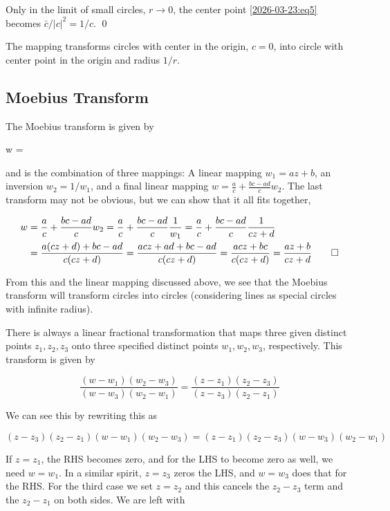 Only in the limit of small circles, $r \rightarrow 0$, the center point \eqref{2026-03-23:eq5} becomes $\bar{c} / |c|^2 = 1 / c$. \qed

The mapping transforms circles with center in the origin, $c = 0$, into circle with center point in the origin and radius $1/r$.



\subsection{Moebius Transform}

The Moebius transform is given by

\bee
w = 
\eee

and is the combination of three mappings: A linear mapping $w_1 = az+b$, an inversion $w_2 = 1/w_1$, and a final linear mapping $w = \frac{a}{c} + \frac{bc - ad}{c} w_2$. The last transform may not be obvious, but we can show that it all fits together,

\begin{align*}
    w &= \frac{a}{c} + \frac{bc - ad}{c} w_2 = \frac{a}{c} + \frac{bc - ad}{c} \frac{1}{w_1} = \frac{a}{c} + \frac{bc - ad}{c} \frac{1}{cz+d} \\
    &= \frac{a(cz+d) + bc - ad}{c(cz+d)} = \frac{acz+ad + bc - ad}{c(cz+d)} = \frac{acz+ bc}{c(cz+d)} = \frac{az + b}{cz + d} \qed
\end{align*}

From this and the linear mapping discussed above, we see that the Moebius transform will transform circles into circles (considering lines as special circles with infinite radius).

There is always a linear fractional transformation that maps three given distinct points $z_1 , z_2, z_3$ onto three specified distinct points $w_1, w_2, w_3$, respectively. This transform is given by

\begin{equation}\label{2026-03-24:eq6}
    \frac{(w - w_1)(w_2 - w_3)}{(w - w_3)(w_2 - w_1)} = \frac{(z - z_1)(z_2 - z_3)}{(z - z_3)(z_2 - z_1)}
\end{equation}

We can see this by rewriting this as

\begin{equation*}
    (z - z_3)(z_2 - z_1)(w - w_1)(w_2 - w_3) = (z - z_1)(z_2 - z_3)(w - w_3)(w_2 - w_1)
\end{equation*}

If $z = z_1$, the RHS becomes zero, and for the LHS to become zero as well, we need $w = w_1$. In a similar spirit, $z = z_3$ zeros the LHS, and $w = w_3$ does that for the RHS. For the third case we set $z = z_2$ and this cancels the $z_2 - z_3$ term and the $z_2 - z_1$ on both sides. We are left with

